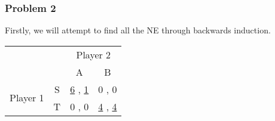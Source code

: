\documentclass[a4paper]{article}
\begin{document}
\subsubsection{Problem 2}
Firstly, we will attempt to find all the NE through backwards induction.

\begin{tabular}{ c c c c  } 

&& \multicolumn{2}{c}{Player 2} \\

&& A & B \\ 
\multirow{2}{4em}{Player 1} & S & \underline{6} , \underline{1} & 0 , 0  \\ 
 & T & 0 , 0 & \underline{4} , \underline{4} \\

\end{tabular}
\end{document}
